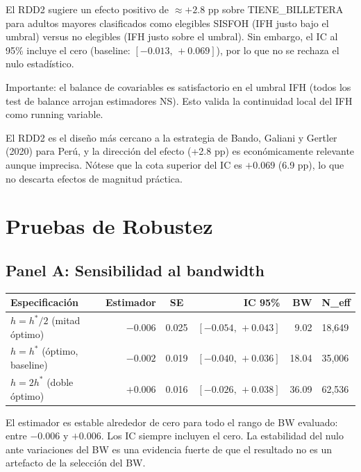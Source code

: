 \documentclass[12pt, a4paper]{article}
\begin{document}
\begin{resultcaja}
El RDD2 sugiere un efecto positivo de $\approx +2.8$ pp sobre TIENE\_BILLETERA
para adultos mayores clasificados como elegibles SISFOH (IFH justo bajo el
umbral) versus no elegibles (IFH justo sobre el umbral). Sin embargo, el IC
al 95\% incluye el cero (baseline: $[-0.013,\, +0.069]$), por lo que no se
rechaza el nulo estadístico.

Importante: el balance de covariables es satisfactorio en el umbral IFH
(todos los test de balance arrojan estimadores NS). Esto valida la
continuidad local del IFH como running variable.

El RDD2 es el diseño más cercano a la estrategia de Bando, Galiani y
Gertler (2020) para Perú, y la dirección del efecto (+2.8 pp) es
económicamente relevante aunque imprecisa. Nótese que la cota superior
del IC es $+0.069$ (6.9 pp), lo que no descarta efectos de magnitud práctica.
\end{resultcaja}

\section{Pruebas de Robustez}

\subsection{Panel A: Sensibilidad al bandwidth}

\begin{center}
\begin{tabular}{lrcrrl}
\toprule
Especificación & Estimador & SE & IC 95\% & BW & N\_eff \\
\midrule
$h = h^*/2$ (mitad óptimo) & $-0.006$ & 0.025 & $[-0.054,\,+0.043]$ & 9.02 & 18{,}649 \\
$h = h^*$ (óptimo, baseline) & $-0.002$ & 0.019 & $[-0.040,\,+0.036]$ & 18.04 & 35{,}006 \\
$h = 2h^*$ (doble óptimo) & $+0.006$ & 0.016 & $[-0.026,\,+0.038]$ & 36.09 & 62{,}536 \\
\bottomrule
\end{tabular}
\end{center}

\begin{interpcaja}[Interpretación]
El estimador es estable alrededor de cero para todo el rango de BW
evaluado: entre $-0.006$ y $+0.006$. Los IC siempre incluyen el cero.
La estabilidad del nulo ante variaciones del BW es una evidencia fuerte
de que el resultado no es un artefacto de la selección del BW.
\end{interpcaja}
\end{document}
